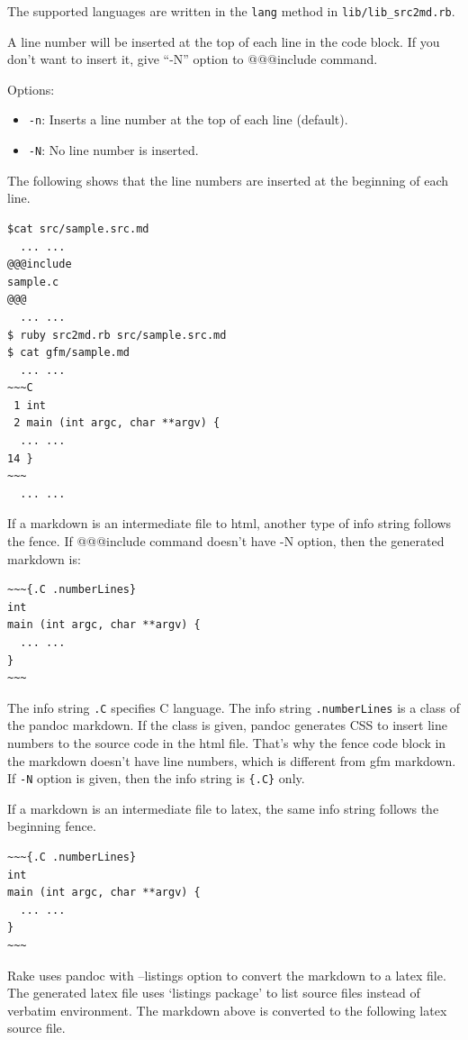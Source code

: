 The supported languages are written in the \texttt{lang} method in
\texttt{lib/lib\_src2md.rb}.

A line number will be inserted at the top of each line in the code
block. If you don't want to insert it, give ``-N'' option to @@@include
command.

Options:

\begin{itemize}
\tightlist
\item
  \texttt{-n}: Inserts a line number at the top of each line (default).
\item
  \texttt{-N}: No line number is inserted.
\end{itemize}

The following shows that the line numbers are inserted at the beginning
of each line.

\begin{verbatim}
$cat src/sample.src.md
  ... ...
@@@include
sample.c
@@@
  ... ...
$ ruby src2md.rb src/sample.src.md
$ cat gfm/sample.md
  ... ...
~~~C
 1 int
 2 main (int argc, char **argv) {
  ... ...
14 }
~~~
  ... ...
\end{verbatim}

If a markdown is an intermediate file to html, another type of info
string follows the fence. If @@@include command doesn't have -N option,
then the generated markdown is:

\begin{verbatim}
~~~{.C .numberLines}
int
main (int argc, char **argv) {
  ... ...
}
~~~
\end{verbatim}

The info string \texttt{.C} specifies C language. The info string
\texttt{.numberLines} is a class of the pandoc markdown. If the class is
given, pandoc generates CSS to insert line numbers to the source code in
the html file. That's why the fence code block in the markdown doesn't
have line numbers, which is different from gfm markdown. If \texttt{-N}
option is given, then the info string is \texttt{\{.C\}} only.

If a markdown is an intermediate file to latex, the same info string
follows the beginning fence.

\begin{verbatim}
~~~{.C .numberLines}
int
main (int argc, char **argv) {
  ... ...
}
~~~
\end{verbatim}

Rake uses pandoc with --listings option to convert the markdown to a
latex file. The generated latex file uses `listings package' to list
source files instead of verbatim environment. The markdown above is
converted to the following latex source file.

